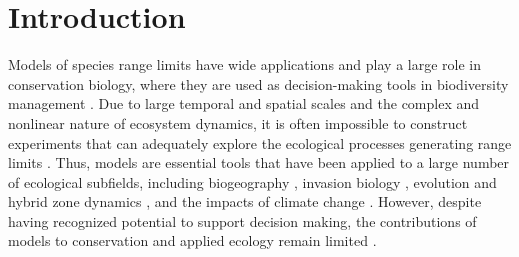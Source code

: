 \section*{Introduction}

Models of species range limits have wide applications and play a large role in conservation biology, where they are used as decision-making tools in biodiversity management \citep{Rosenzweig2008, Thuiller2008, Rodenhouse2009}.
Due to large temporal and spatial scales and the complex and nonlinear nature of ecosystem dynamics, it is often impossible to construct experiments that can adequately explore the ecological processes generating range limits \citep{Wu1995, Levin1998}. 
Thus, models are essential tools that have been applied to a large number of ecological subfields, including biogeography \citep{Schurr2012}, invasion biology \citep{Catterall2012, Gallien2012}, evolution and hybrid zone dynamics \citep{Engler2013}, and the impacts of climate change  \citep{Rosenzweig2008, Thuiller2008, Milad2011, Blois2013, Loyola2013}. 
However, despite having recognized potential to support decision making, the contributions of models to conservation and applied ecology remain limited \citep{Dawson2011, Guisan2013}.

